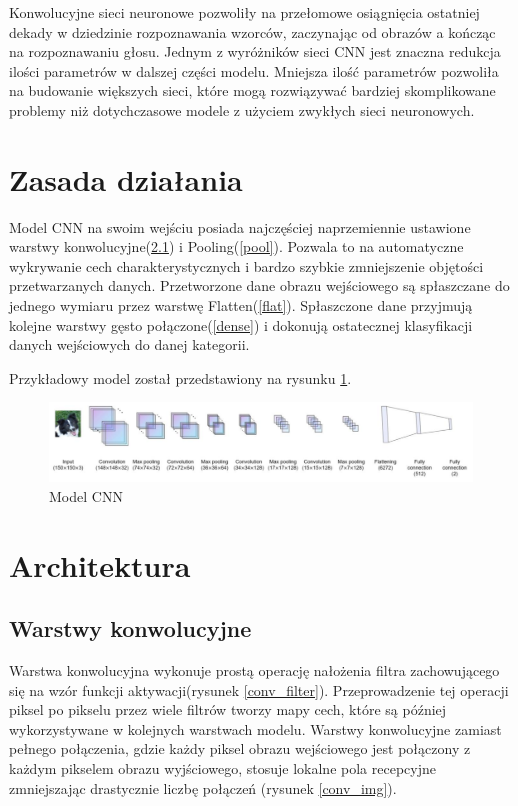 \documentclass[a4paper,12pt,oneside]{book} %
\begin{document}
Konwolucyjne sieci neuronowe pozwoliły na przełomowe osiągnięcia ostatniej dekady w dziedzinie rozpoznawania wzorców, zaczynając od obrazów a kończąc na rozpoznawaniu głosu. Jednym z wyróżników sieci CNN jest znaczna redukcja ilości parametrów w dalszej części modelu. Mniejsza ilość parametrów pozwoliła na budowanie większych sieci, które mogą rozwiązywać bardziej skomplikowane problemy niż dotychczasowe modele z użyciem zwykłych sieci neuronowych\cite{8308186}.

\section{Zasada działania}

Model CNN na swoim wejściu posiada najczęściej naprzemiennie ustawione warstwy konwolucyjne(\ref{konw}) i Pooling(\ref{pool}). Pozwala to na automatyczne wykrywanie cech charakterystycznych i bardzo szybkie zmniejszenie objętości przetwarzanych danych. Przetworzone dane obrazu wejściowego są spłaszczane do jednego wymiaru przez warstwę Flatten(\ref{flat}). Spłaszczone dane przyjmują kolejne warstwy gęsto połączone(\ref{dense}) i dokonują ostatecznej klasyfikacji danych wejściowych do danej kategorii\cite{9463236}.

Przykładowy model został przedstawiony na rysunku \ref{cnn_mod}.

\begin{figure}[h]
	\centering
	\includegraphics[scale=0.55]{cnn_arch.png}
	\caption{Model CNN\cite{9463236}}
	\label{cnn_mod}
\end{figure}

\section{Architektura}

\subsection{Warstwy konwolucyjne}
\label{konw}

Warstwa konwolucyjna wykonuje prostą operację nałożenia filtra zachowującego się na wzór funkcji aktywacji(rysunek \ref{conv_filter}). Przeprowadzenie tej operacji piksel po pikselu przez wiele filtrów tworzy mapy cech, które są później wykorzystywane w kolejnych warstwach modelu\cite{9388351}. Warstwy konwolucyjne zamiast pełnego połączenia, gdzie każdy piksel obrazu wejściowego jest połączony z każdym pikselem obrazu wyjściowego, stosuje lokalne pola recepcyjne zmniejszając drastycznie liczbę połączeń (rysunek \ref{conv_img}).
\end{document}
